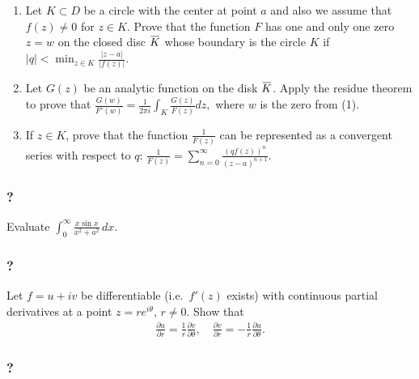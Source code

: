 \begin{enumerate}
\def\labelenumi{(\arabic{enumi})}
\item
  Let \(K\subset D\) be a circle with the center at point \(a\) and also
  we assume that \(f(z)\not =0\) for \(z\in K\). Prove that the function
  \(F\) has one and only one zero \(z=w\) on the closed disc
  \(\mkern 1.5mu\overline{\mkern-1.5muK\mkern-1.5mu}\mkern 1.5mu\) whose
  boundary is the circle \(K\) if
  \(\displaystyle{ |q|<\min_{z\in K} \frac{|z-a|}{|f(z)|}.}\)\\
\item
  Let \(G(z)\) be an analytic function on the disk
  \(\mkern 1.5mu\overline{\mkern-1.5muK\mkern-1.5mu}\mkern 1.5mu\).
  Apply the residue theorem to prove that
  \(\displaystyle{ \frac{G(w)}{F'(w)}=\frac{1}{2\pi i}\int_K \frac{G(z)}{F(z)} dz,}\)
  where \(w\) is the zero from (1).\\
\item
  If \(z\in K\), prove that the function
  \(\displaystyle{\frac{1}{F(z)}}\) can be represented as a convergent
  series with respect to \(q\):
  \(\displaystyle{ \frac{1}{F(z)}=\sum_{n=0}^{\infty} \frac{(qf(z))^n}{(z-a)^{n+1}}.}\)
\end{enumerate}

\hypertarget{section-105}{%
\subsubsection{?}\label{section-105}}

Evaluate
\(\displaystyle{ \int_{0}^{\infty}\frac{x\sin x}{x^2+a^2} \, dx }\).

\hypertarget{section-106}{%
\subsubsection{?}\label{section-106}}

Let \(f=u+iv\) be differentiable (i.e.~\(f'(z)\) exists) with continuous
partial derivatives at a point \(z=re^{i\theta}\), \(r\not= 0\). Show
that
\begin{align*}\frac{\partial u}{\partial r}=\frac{1}{r}\frac{\partial v}{\partial \theta},\quad
\frac{\partial v}{\partial r}=-\frac{1}{r}\frac{\partial u}{\partial \theta}.\end{align*}

\hypertarget{section-107}{%
\subsubsection{?}\label{section-107}}

